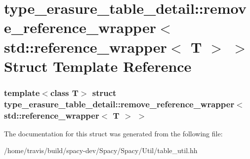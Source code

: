 \hypertarget{structtype__erasure__table__detail_1_1remove__reference__wrapper_3_01std_1_1reference__wrapper_3_01T_01_4_01_4}{\section{type\-\_\-erasure\-\_\-table\-\_\-detail\-:\-:remove\-\_\-reference\-\_\-wrapper$<$ std\-:\-:reference\-\_\-wrapper$<$ \-T $>$ $>$ \-Struct \-Template \-Reference}
\label{structtype__erasure__table__detail_1_1remove__reference__wrapper_3_01std_1_1reference__wrapper_3_01T_01_4_01_4}
}
\subsubsection*{template$<$class T$>$ struct type\-\_\-erasure\-\_\-table\-\_\-detail\-::remove\-\_\-reference\-\_\-wrapper$<$ std\-::reference\-\_\-wrapper$<$ T $>$ $>$}



\-The documentation for this struct was generated from the following file\-:\begin{DoxyCompactItemize}
\item 
/home/travis/build/spacy-\/dev/\-Spacy/\-Spacy/\-Util/table\-\_\-util.\-hh\end{DoxyCompactItemize}
